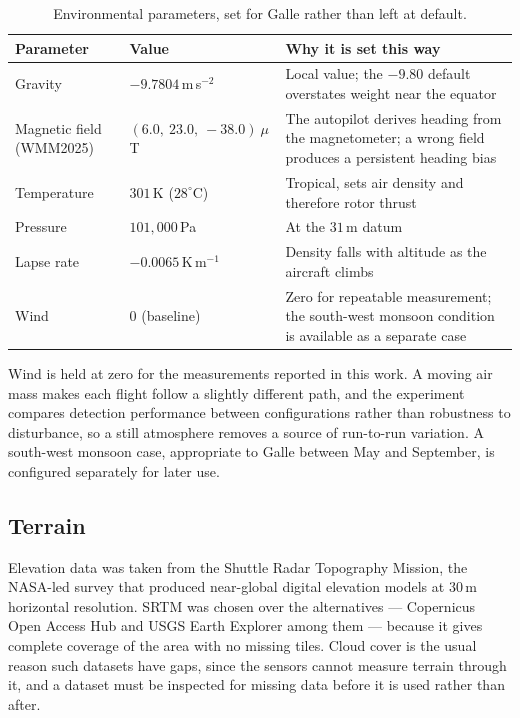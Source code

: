 \begin{table}[htbp]
\centering
\caption{Environmental parameters, set for Galle rather than left at default.}
\label{tab:world-params}
\begin{tabular}{@{}llp{58mm}@{}}
\toprule
Parameter & Value & Why it is set this way \\
\midrule
Gravity
  & $-9.7804$\,m\,s$^{-2}$
  & Local value; the $-9.80$ default overstates weight near the equator \\[3pt]
Magnetic field (WMM2025)
  & $(6.0,\ 23.0,\ -38.0)\ \mu$T
  & The autopilot derives heading from the magnetometer; a wrong field
    produces a persistent heading bias \\[3pt]
Temperature
  & $301$\,K ($28^{\circ}$C)
  & Tropical, sets air density and therefore rotor thrust \\[3pt]
Pressure
  & $101{,}000$\,Pa
  & At the $31$\,m datum \\[3pt]
Lapse rate
  & $-0.0065$\,K\,m$^{-1}$
  & Density falls with altitude as the aircraft climbs \\[3pt]
Wind
  & $0$ (baseline)
  & Zero for repeatable measurement; the south-west monsoon condition
    is available as a separate case \\
\bottomrule
\end{tabular}
\end{table}

Wind is held at zero for the measurements reported in this work. A moving
air mass makes each flight follow a slightly different path, and the
experiment compares detection performance between configurations rather than
robustness to disturbance, so a still atmosphere removes a source of
run-to-run variation. A south-west monsoon case, appropriate to Galle between
May and September, is configured separately for later use.

\subsection{Terrain}
\label{sec:world-terrain}

Elevation data was taken from the Shuttle Radar Topography Mission, the
NASA-led survey that produced near-global digital elevation models at
$30$\,m horizontal resolution. SRTM was chosen over the alternatives ---
Copernicus Open Access Hub and USGS Earth Explorer among them --- because it
gives complete coverage of the area with no missing tiles. Cloud cover is
the usual reason such datasets have gaps, since the sensors cannot measure
terrain through it, and a dataset must be inspected for missing data before
it is used rather than after.

